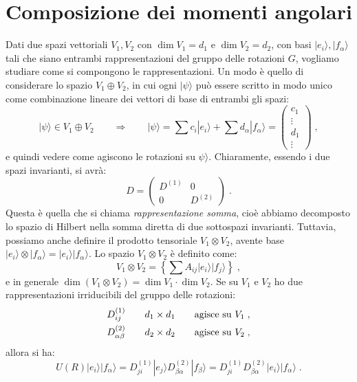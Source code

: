 \documentclass[12pt,a4paper]{report}
\theoremstyle{definition}
\numberwithin{equation}{section}
\newcommand{\ket}{\rangle}
\begin{document}
\section{Composizione dei momenti angolari}
Dati due spazi vettoriali $V_1,V_2$ con $\dim V_1=d_1$ e $\dim V_2=d_2$, con basi $|e_i\ket,|f_{\alpha}\ket$ tali che siano entrambi rappresentazioni del gruppo delle rotazioni $G$, vogliamo studiare come si compongono le rappresentazioni. Un modo è quello di considerare lo spazio $V_1\oplus V_2$, in cui ogni $|\psi\ket$ può essere scritto in modo unico come combinazione lineare dei vettori di base di entrambi gli spazi:
\begin{equation}
|\psi\ket\in V_1\oplus V_2 \qquad \Longrightarrow\qquad |\psi\ket=\sum c_i|e_i\ket+\sum d_{\alpha}|f_{\alpha}\ket=
\left(\begin{matrix}
c_1 \\
\vdots \\
d_1 \\
\vdots
\end{matrix}\right)\;,
\end{equation}
e quindi vedere come agiscono le rotazioni su $\psi\ket$. Chiaramente, essendo i due spazi invarianti, si avrà:
\begin{equation}
D=\left(\begin{matrix}
D^{(1)} & 0 \\
0 & D^{(2)}
\end{matrix}\right)\;.
\end{equation}
Questa è quella che si chiama \textit{rappresentazione somma}, cioè abbiamo decomposto lo spazio di Hilbert nella somma diretta di due sottospazi invarianti. Tuttavia, possiamo anche definire il prodotto tensoriale $V_1\otimes V_2$, avente base $|e_i\ket\otimes |f_{\alpha}\ket=|e_i\ket|f_{\alpha}\ket$. Lo spazio $V_1\otimes V_2$ è definito come:
\begin{equation}
V_1\otimes V_2=\left\{\sum A_{ij}|e_i\ket|f_j\ket\right\}\;,
\end{equation}
e in generale $\dim(V_1\otimes V_2)=\dim V_1\cdot\dim V_2$. Se su $V_1$ e $V_2$ ho due rappresentazioni irriducibili del gruppo delle rotazioni:
\begin{align}
D_{ij}^{(1)} \qquad d_1\times d_1\qquad \mbox{agisce su $V_1$}\;, \notag \\
D_{\alpha\beta}^{(2)} \qquad d_2\times d_2\qquad \mbox{agisce su $V_2$}\;,
\end{align}
allora si ha:
\begin{equation}
U(R)|e_i\ket|f_{\alpha}\ket=D_{ji}^{(1)}|e_j\ket D_{\beta\alpha}^{(2)}|f_{\beta}\ket=D_{ji}^{(1)}D_{\beta\alpha}^{(2)}|e_i\ket|f_{\alpha}\ket\;.
\end{equation}
\end{document}
